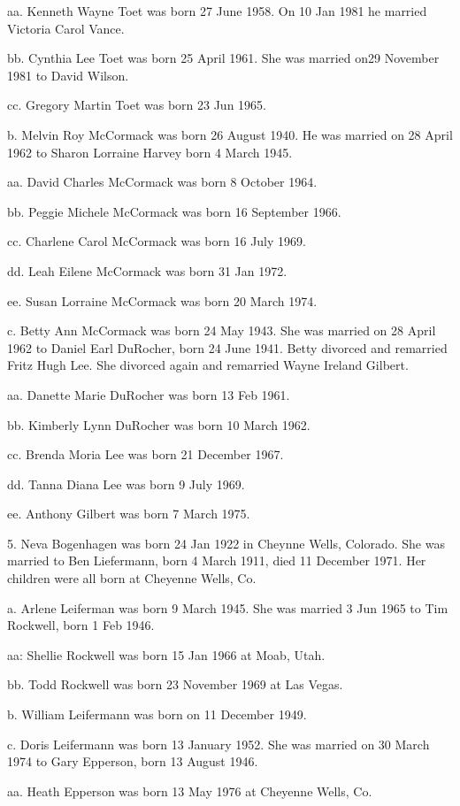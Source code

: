 \documentclass[a4paper]{article}
\begin{document}
aa. Kenneth Wayne Toet was born 27 June 1958.  On 10 Jan 1981 he married Victoria Carol Vance.

bb. Cynthia Lee Toet was born 25 April 1961.  She was married on29 November 1981 to David Wilson.

cc. Gregory Martin Toet was born 23 Jun 1965.

b. Melvin Roy McCormack was born 26 August 1940.  He was married on 28 April 1962 to Sharon Lorraine Harvey born 4 March 1945.

aa. David Charles McCormack was born 8 October 1964.

bb. Peggie Michele McCormack was born 16 September 1966.

cc. Charlene Carol McCormack was born 16 July 1969.

dd. Leah Eilene McCormack was born 31 Jan 1972.

ee. Susan Lorraine McCormack was born 20 March 1974.

c. Betty Ann McCormack was born 24 May 1943.  She was married on 28 April 1962 to Daniel Earl DuRocher, born 24 June 1941.  Betty divorced and remarried Fritz Hugh Lee. She divorced again and remarried Wayne Ireland Gilbert. 

aa. Danette Marie DuRocher was born 13 Feb 1961.

bb. Kimberly Lynn DuRocher was born 10 March 1962.

cc. Brenda Moria Lee was born 21 December 1967.

dd. Tanna Diana Lee was born 9 July 1969.

ee. Anthony Gilbert was born 7 March 1975.

5. Neva Bogenhagen was born 24 Jan 1922 in Cheynne Wells, Colorado.  She was married to Ben Liefermann, born 4 March 1911, died 11 December 1971. Her children were all born at Cheyenne Wells, Co.

a. Arlene Leiferman was born 9 March 1945.  She was married 3 Jun 1965 to Tim Rockwell, born 1 Feb 1946.

aa: Shellie Rockwell was born 15 Jan 1966 at Moab, Utah.

bb. Todd Rockwell was born 23 November 1969 at Las Vegas.

b. William Leifermann was born on 11 December 1949.

c. Doris Leifermann was born 13 January 1952.  She was married on 30 March 1974 to Gary Epperson, born 13 August 1946. 

aa. Heath Epperson was born 13 May 1976 at Cheyenne Wells, Co.
\end{document}
